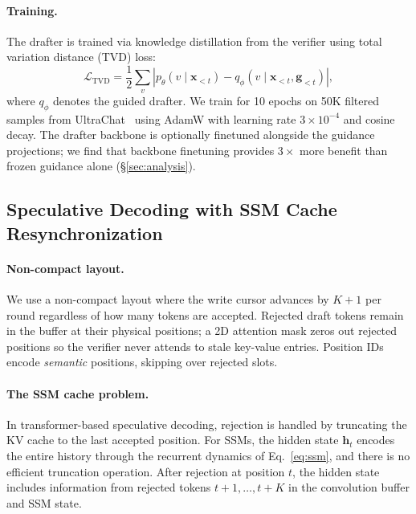 \paragraph{Training.}
The drafter is trained via knowledge distillation from the verifier using total variation distance (TVD) loss:
\begin{equation}
  \mathcal{L}_{\mathrm{TVD}} = \frac{1}{2} \sum_v |p_\theta(v \mid \mathbf{x}_{<t}) - q_\phi(v \mid \mathbf{x}_{<t}, \mathbf{g}_{<t})|,
  \label{eq:tvd}
\end{equation}
where $q_\phi$ denotes the guided drafter.
We train for 10 epochs on 50K filtered samples from UltraChat~\citep{ding2023ultrachat} using AdamW with learning rate $3{\times}10^{-4}$ and cosine decay.
The drafter backbone is optionally finetuned alongside the guidance projections; we find that backbone finetuning provides $3{\times}$ more benefit than frozen guidance alone (\S\ref{sec:analysis}).

\subsection{Speculative Decoding with SSM Cache Resynchronization}
\label{sec:replay}

\paragraph{Non-compact layout.}
We use a non-compact layout where the write cursor advances by $K+1$ per round regardless of how many tokens are accepted.
Rejected draft tokens remain in the buffer at their physical positions; a 2D attention mask zeros out rejected positions so the verifier never attends to stale key-value entries.
Position IDs encode \emph{semantic} positions, skipping over rejected slots.

\paragraph{The SSM cache problem.}
In transformer-based speculative decoding, rejection is handled by truncating the KV cache to the last accepted position.
For SSMs, the hidden state $\mathbf{h}_t$ encodes the entire history through the recurrent dynamics of Eq.~\eqref{eq:ssm}, and there is no efficient truncation operation.
After rejection at position $t$, the hidden state includes information from rejected tokens $t+1, \ldots, t+K$ in the convolution buffer and SSM state.

